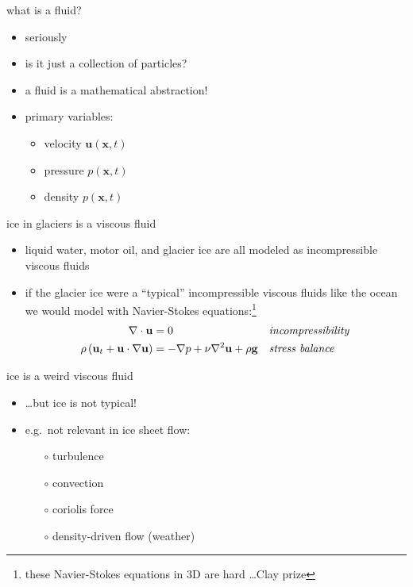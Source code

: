 \documentclass{beamer}
\newcommand{\bx}{\mathbf{x}}
\begin{document}
\begin{frame}{what is a fluid?}

\bigskip
\begin{itemize}
\item seriously
\item<2-> is it just a collection of particles?
\item<3-> a fluid is a mathematical abstraction!
\item<4-> primary variables:
  \begin{itemize}
  \item<4->[$\circ$]   velocity $\mathbf{u}(\bx,t)$
  \item<4->[$\circ$]   pressure $p(\bx,t)$
  \item<4->[$\circ$]   density $p(\bx,t)$
  \end{itemize}
\end{itemize}
\end{frame}



\begin{frame}{ice in glaciers is a viscous fluid}

\begin{itemize}
\item liquid water, motor oil, and glacier ice are all modeled as \alert{incompressible viscous fluids}
\item if the glacier ice were a ``typical'' incompressible viscous fluids like the ocean we would model with Navier-Stokes equations:\footnote{these Navier-Stokes equations in 3D are hard \dots Clay prize}
\begin{align*}
\nabla \cdot \mathbf{u} &= 0 &&\text{\emph{incompressibility}} \\
\rho \left(\mathbf{u}_t + \mathbf{u}\cdot\nabla \mathbf{u}\right) &= -\nabla p + \nu \nabla^2 \mathbf{u} + \rho \mathbf{g} &&\text{\emph{stress balance}}
\end{align*}
\end{itemize}
\end{frame}



\begin{frame}{ice is a weird viscous fluid}

\begin{itemize}
\item \dots but ice is not typical!
\item e.g.~not relevant in ice sheet flow:
  \begin{itemize}
  \item[$\circ$] turbulence
  \item[$\circ$] convection
  \item[$\circ$] coriolis force
  \item[$\circ$] density-driven flow (weather)
  \end{itemize}
\end{itemize}
\end{frame}
\end{document}
